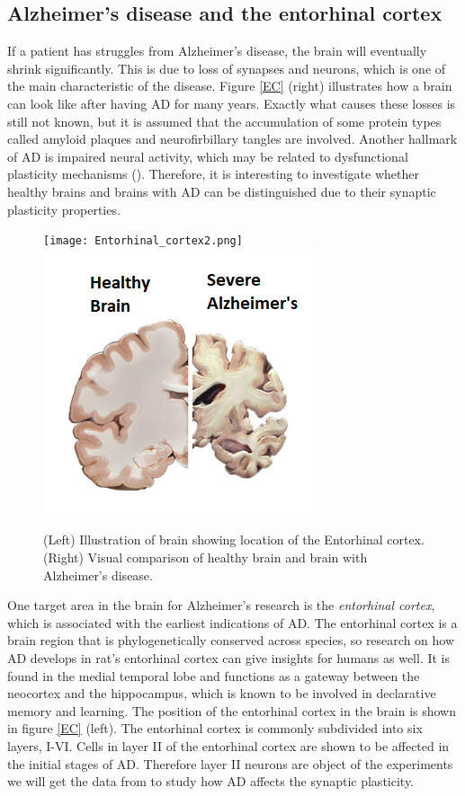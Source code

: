 \subsection{Alzheimer's disease and the entorhinal cortex}
\label{EandA}

If a patient has struggles from Alzheimer's disease, the brain will eventually shrink significantly. This is due to loss of synapses and neurons, which is one of the main characteristic of the disease. Figure \ref{EC} (right) illustrates how a brain can look like after having AD for many years. Exactly what causes these losses is still not known, but it is assumed that the accumulation of some protein types called amyloid plaques and neurofirbillary tangles are involved. Another hallmark of AD is impaired neural activity, which may be related to dysfunctional plasticity mechanisms (\cite{Zott}). Therefore, it is interesting to investigate whether healthy brains and brains with AD can be distinguished due to their synaptic plasticity properties.

\begin{figure}[h]
    \caption{(Left) Illustration of brain showing location of the Entorhinal cortex. (Right) Visual comparison of healthy brain and brain with Alzheimer's disease.}
    \label{EC}
    \centering
    \texttt{[image: Entorhinal\_cortex2.png]}
    \includegraphics[scale=0.8]{fig/Alzheimers_picture.png}    
    \label{brain}
\end{figure} 

One target area in the brain for Alzheimer's research is the \textit{entorhinal cortex}, which is associated with the earliest indications of AD. The entorhinal cortex is a brain region that is phylogenetically conserved across species, so research on how AD develops in rat's entorhinal cortex can give insights for humans as well. It is found in the medial temporal lobe and functions as a gateway between the neocortex and the hippocampus, which is known to be involved in declarative memory and learning. The position  of the entorhinal cortex in the brain is shown in figure \ref{EC} (left). The entorhinal cortex is commonly subdivided into six layers, I-VI. Cells in layer II of the entorhinal cortex are shown to be affected in the initial stages of AD. Therefore layer II neurons are object of the experiments we will get the data from to study how AD affects the synaptic plasticity.





